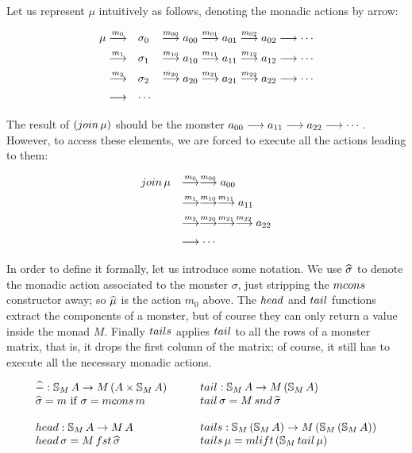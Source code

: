 Let us represent $\mu$ intuitively as follows, denoting the monadic actions by arrow:

$$
\begin{array}[t]{rll}
\mu \stackrel{m_0}{\longrightarrow} 
 & \sigma_0 
 & \stackrel{m_{00}}{\longrightarrow} a_{00} \stackrel{m_{01}}{\longrightarrow} a_{01} \stackrel{m_{02}}{\longrightarrow} a_{02} \stackrel{}{\longrightarrow} \cdots\\[5pt]
\stackrel{m_1}{\longrightarrow} 
 & \sigma_1 
 & \stackrel{m_{10}}{\longrightarrow} a_{10} \stackrel{m_{11}}{\longrightarrow} a_{11} \stackrel{m_{12}}{\longrightarrow} a_{12} \stackrel{}{\longrightarrow} \cdots\\[5pt]
\stackrel{m_2}{\longrightarrow} 
 & \sigma_2
 & \stackrel{m_{20}}{\longrightarrow} a_{20} \stackrel{m_{21}}{\longrightarrow} a_{21} \stackrel{m_{22}}{\longrightarrow} a_{22} \stackrel{}{\longrightarrow} \cdots\\[5pt]
\stackrel{}{\longrightarrow} & \cdots
\end{array}
$$

The result of $(\join\,\mu)$ should be the monster $a_{00} \stackrel{}{\longrightarrow} a_{11}\stackrel{}{\longrightarrow} a_{22} \stackrel{}{\longrightarrow} \cdots$.
However, to access these elements, we are forced to execute all the actions leading to them:

$$
\begin{array}{ll}
\join\,\mu 
& \larrow{m_0}\larrow{m_{00}} a_{00}\\[5pt]
& \larrow{m_1}\larrow{m_{10}}\larrow{m_{11}} a_{11}\\[5pt]
& \larrow{m_2}\larrow{m_{20}}\larrow{m_{21}}\larrow{m_{22}} a_{22}\\[5pt]
& \larrow{} \cdots
\end{array}
$$

In order to define it formally, let us introduce some notation.
We use $\widehat{\sigma}$ to denote the monadic action associated to the monster $\sigma$, just stripping the $\mcons$ constructor away; so $\widehat{\mu}$ is the action $m_0$ above.
The $\head$ and $\tail$ functions extract the components of a monster, but of course they can only return a value inside the monad $M$.
Finally $\tails$ applies $\tail$ to all the rows of a monster matrix, that is, it drops the first column of the matrix; of course, it still has to execute all the necessary monadic actions.

$$
\begin{array}{ll}
\unc{-} : \stream{M}\,A \rightarrow M\,(A\times \stream{M}\,A)\\
\unc{\sigma} = m \mbox{ if } \sigma = \mcons\,m\\
\, \\
\head : \stream{M}\,A \rightarrow M\,A\\
\head\,\sigma = M\,\fst\,\unc{\sigma}
\end{array}
\qquad
\begin{array}{ll}
\tail : \stream{M}\,A \rightarrow M\,(\stream{M}\,A)\\
\tail\,\sigma = M\,\snd\,\unc{\sigma}\\
\, \\
\tails : \stream{M}\,(\stream{M}\,A) \rightarrow M\,(\stream{M}\,(\stream{M}\,A))\\
\tails\,\mu = \mlift\,(\stream{M}\,\tail\,\mu)
\end{array}
$$

